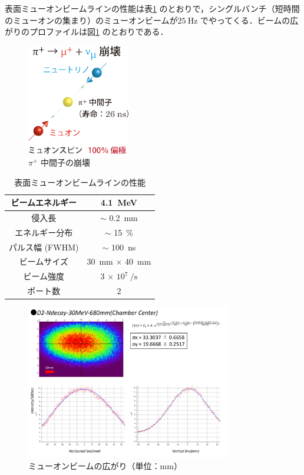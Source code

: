 表面ミューオンビームラインの性能は表\ref{muon1} のとおりで，シングルバンチ（短時間のミューオンの集まり）のミューオンビームが$25~\mathrm{Hz}$ でやってくる．ビームの広がりのプロファイルは図\ref{muon2} のとおりである．%

\begin{figure}[H]
\centering
\includegraphics[width=0.4\textwidth]{figure/hayakawa/decay_pion.png}
\caption{$\pi^{+}$ 中間子の崩壊\cite{aboutmuon}}
\end{figure}

\begin{table}[H]
\caption{表面ミューオンビームラインの性能}
\label{muon1}
\centering
\begin{tabular}{cc}\toprule
ビームエネルギー & 4.1~MeV \\ \midrule
侵入長 & $\sim$ 0.2~mm \\ \midrule
エネルギー分布 & $\sim$ 15~\% \\ \midrule
パルス幅 (FWHM) & $\sim$ 100~ns \\ \midrule
ビームサイズ & 30~mm $\times$ 40~mm \\ \midrule
ビーム強度 & 3 $\times$ $10^7~/\mathrm{s}$ \\ \midrule
ポート数 & 2 \\ \bottomrule
\end{tabular}
\end{table}
   
\begin{figure}[H]
\centering
\includegraphics[width=0.8\textwidth]{figure/hayakawa/profile.pdf}
\caption{ミューオンビームの広がり（単位：$\mathrm{mm}$）}
\label{muon2}
\end{figure}

